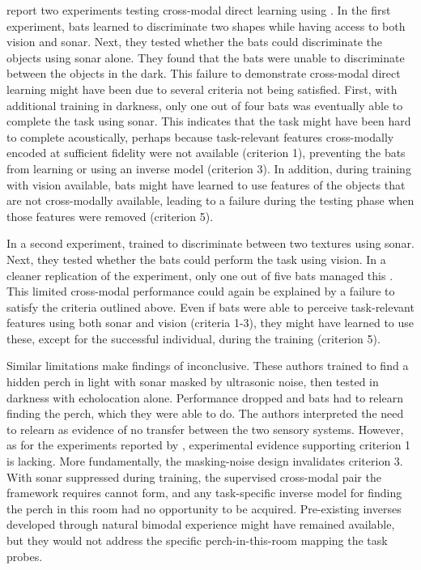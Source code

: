 \documentclass[11pt]{article}
\begin{document}
\citet{Danilovich2019} report two experiments testing cross-modal direct learning using . In the first experiment, bats learned to discriminate two shapes while having access to both vision and sonar. Next, they tested whether the bats could discriminate the objects using sonar alone. They found that the bats were unable to discriminate between the objects in the dark.
This failure to demonstrate cross-modal direct learning might have been due to several criteria not being satisfied. First, with additional training in darkness, only one out of four bats was eventually able to complete the task using sonar. This indicates that the task might have been hard to complete acoustically, perhaps because task-relevant features cross-modally encoded at sufficient fidelity were not available (criterion 1), preventing the bats from learning or using an inverse model (criterion 3). In addition, during training with vision available, bats might have learned to use features of the objects that are not cross-modally available, leading to a failure during the testing phase when those features were removed (criterion 5).


In a second experiment, \citet{Danilovich2019} trained  to discriminate between two textures using sonar. Next, they tested whether the bats could perform the task using vision. In a cleaner replication of the experiment, only one out of five bats managed this \citep[Round 2 in][]{Danilovich2019}. This limited cross-modal performance could again be explained by a failure to satisfy the criteria outlined above. Even if bats were able to perceive task-relevant features using both sonar and vision (criteria 1-3), they might have learned to use these, except for the successful individual, during the training (criterion 5).


Similar limitations make findings of \citet{Holland2005} inconclusive. These authors trained  to find a hidden perch in light with sonar masked by ultrasonic noise, then tested in darkness with echolocation alone. Performance dropped and bats had to relearn finding the perch, which they were able to do. The authors interpreted the need to relearn as evidence of no transfer between the two sensory systems. However, as for the experiments reported by \citet{Danilovich2019}, experimental evidence supporting criterion 1 is lacking. More fundamentally, the masking-noise design invalidates criterion 3. With sonar suppressed during training, the supervised cross-modal pair the framework requires cannot form, and any task-specific inverse model for finding the perch in this room had no opportunity to be acquired. Pre-existing inverses developed through natural bimodal experience might have remained available, but they would not address the specific perch-in-this-room mapping the task probes.
\end{document}
